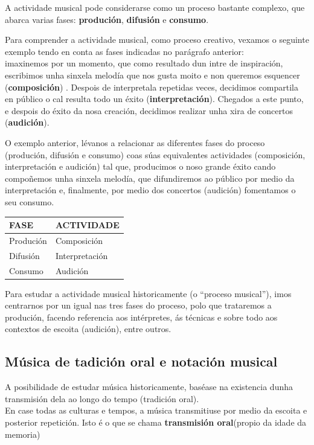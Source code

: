 \documentclass[a4paper, twoside]{templates/ociamthesis}
\theoremstyle{definition}
\theoremstyle{definition}
\theoremstyle{definition}
\theoremstyle{definition}
\theoremstyle{remark}
\begin{document}
A actividade musical pode considerarse como un proceso bastante complexo, que abarca varias fases: \textbf{produción}, \textbf{difusión} e \textbf{consumo}.

Para comprender a actividade musical, como proceso creativo, vexamos o seguinte exemplo tendo en conta as fases indicadas no parágrafo anterior:\\
imaxinemos por un momento, que como resultado dun intre de inspiración, escribimos unha sinxela melodía que nos gusta moito e non queremos esquencer (\textbf{composición}) . Despois de interpretala repetidas veces, decidimos compartila en público o cal resulta todo un éxito (\textbf{interpretación}). Chegados a este punto, e despois do éxito da nosa creación, decidimos realizar unha xira de concertos (\textbf{audición}).

O exemplo anterior, lévanos a relacionar as diferentes fases do proceso (produción, difusión e consumo) coas súas equivalentes actividades (composición, interpretación e audición) tal que, producimos o noso grande éxito cando compoñemos unha sinxela melodía, que difundiremos ao público por medio da interpretación e, finalmente, por medio dos concertos (audición) fomentamos o seu consumo.

\begin{longtable}[]{@{}ll@{}}
\toprule
FASE & ACTIVIDADE\tabularnewline
\midrule
\endhead
Produción & Composición\tabularnewline
Difusión & Interpretación\tabularnewline
Consumo & Audición\tabularnewline
\bottomrule
\end{longtable}

Para estudar a actividade musical historicamente (o ``proceso musical''), imos centrarnos por un igual nas tres fases do proceso, polo que trataremos a produción, facendo referencia aos intérpretes, ás técnicas e sobre todo aos contextos de escoita (audición), entre outros.

\hypertarget{muxfasica-de-tadiciuxf3n-oral-e-notaciuxf3n-musical}{%
\subsection*{Música de tadición oral e notación musical}\label{muxfasica-de-tadiciuxf3n-oral-e-notaciuxf3n-musical}}

A posibilidade de estudar música historicamente, baséase na existencia dunha transmisión dela ao longo do tempo (tradición oral).\\
En case todas as culturas e tempos, a música transmitiuse por medio da escoita e posterior repetición. Isto é o que se chama \textbf{transmisión oral}(propio da idade da memoria)
\end{document}
